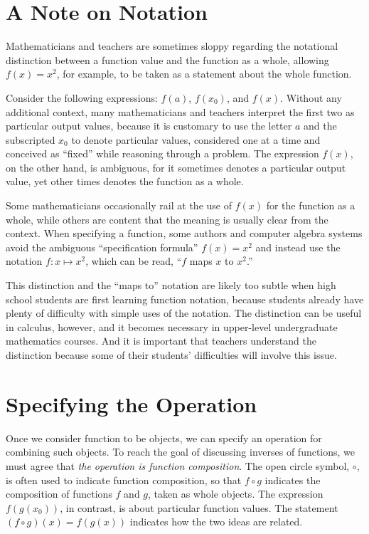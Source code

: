 \documentclass{ximera}
\begin{document}
\section*{A Note on Notation}
Mathematicians and teachers are sometimes sloppy regarding the notational distinction between a function value and the function as a whole, allowing $f(x)=x^2$, for example, to be taken as a statement about the whole function. 

Consider the following expressions:  $f(a)$, $f(x_0)$, and $f(x)$.  Without any additional context, many mathematicians and teachers interpret the first two as particular output values, because it is customary to use the letter $a$ and the subscripted $x_0$ to denote particular values, considered one at a time and conceived as ``fixed'' while reasoning through a problem.  The expression $f(x)$, on the other hand, is ambiguous, for it sometimes denotes a particular output value, yet other times denotes the function as a whole.  

Some mathematicians occasionally rail at the use of  $f(x)$ for the function as a whole, while others are content that the meaning is usually clear from the context.  When specifying a function, some authors and computer algebra systems avoid the ambiguous ``specification formula'' $f(x)=x^2$ and instead use the notation $f: x\mapsto x^2$, which can be read, ``$f$ maps $x$ to $x^2$.''

This distinction and the ``maps to'' notation are likely too subtle when high school students are first learning function notation, because students already have plenty of difficulty with simple uses of the notation.  The distinction can be useful in calculus, however, and it becomes necessary in upper-level undergraduate mathematics courses.  And it is important that teachers understand the distinction because some of their students' difficulties will involve this issue.

%
%

\section*{Specifying the Operation}
Once we consider function to be objects, we can specify an operation for combining such objects.  To reach the goal of discussing inverses of functions, we must agree that \emph{the operation is function composition}.  The open circle symbol, $\circ$, is often used to indicate function composition, so that $f\circ g$  indicates the composition of functions $f$ and $g$, taken as whole objects.  The expression $f(g(x_0))$, in contrast, is about particular function values.  The statement $(f\circ g)(x) = f(g(x))$ indicates how the two ideas are related.  
\end{document}

